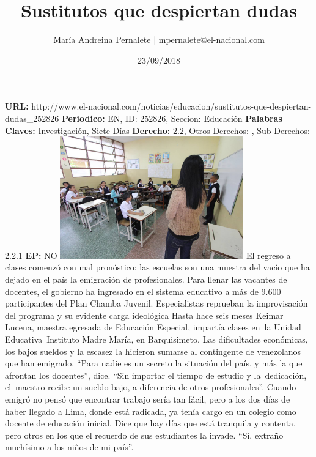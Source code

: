 \documentclass{article}%
\title{\textbf{Sustitutos que despiertan dudas}}%
\author{María Andreina Pernalete | mpernalete@el{-}nacional.com}%
\date{23/09/2018}%
\begin{document}
%
\normalsize%
\maketitle%
\textbf{URL: }%
http://www.el{-}nacional.com/noticias/educacion/sustitutos{-}que{-}despiertan{-}dudas\_252826\newline%
%
\textbf{Periodico: }%
EN, %
ID: %
252826, %
Seccion: %
Educación\newline%
%
\textbf{Palabras Claves: }%
Investigación, Siete Días\newline%
%
\textbf{Derecho: }%
2.2, %
Otros Derechos: %
, %
Sub Derechos: %
2.2.1\newline%
%
\textbf{EP: }%
NO\newline%
\newline%
%
\textbf{\textit{}}%
\newline%
\newline%
%
\includegraphics[width=300px]{79.jpg}%
\newline%
%
El regreso a clases comenzó con mal pronóstico: las escuelas son una muestra del vacío que ha dejado en el país la emigración de profesionales. Para llenar las vacantes de docentes, el gobierno ha ingresado en el sistema educativo a más de 9.600 participantes del Plan Chamba Juvenil. Especialistas reprueban la improvisación del programa y su evidente carga ideológica%
\newline%
%
Hasta hace seis meses Keimar Lucena, maestra egresada de Educación Especial, impartía clases en~la Unidad Educativa~Instituto Madre María, en Barquisimeto. Las dificultades económicas, los bajos sueldos y la escasez la hicieron sumarse al contingente de venezolanos que han emigrado. “Para nadie es un secreto la situación del país, y más la que afrontan los docentes”, dice. “Sin importar el tiempo de estudio y la~dedicación, el~maestro recibe un sueldo bajo, a diferencia de otros profesionales”.%
\newline%
%
Cuando emigró no pensó que encontrar trabajo sería tan fácil, pero a los dos días de haber llegado a Lima, donde está radicada, ya tenía cargo en un colegio como docente de educación inicial. Dice que hay días que está tranquila y contenta, pero otros en los que el recuerdo de sus estudiantes la invade. “Sí, extraño muchísimo a los niños de mi país”.%
\end{document}
